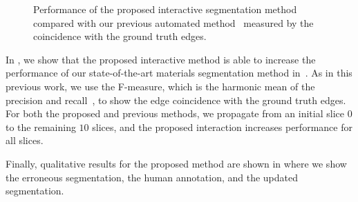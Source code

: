 \documentclass[]{spie}  %
\begin{document}
\begin{figure}[htbp]
\centering
{}

\hspace{0.1em}
\caption{Performance of the proposed interactive segmentation method
  compared with our previous automated method~\cite{waggoner:11}
  measured by the coincidence with the ground truth edges.}
\label{fig:perform}
\end{figure}

In , we show that the proposed interactive method is able
to increase the performance of our state-of-the-art materials
segmentation method in~\cite{waggoner:11}.  As in this previous work,
we use the F-measure, which is the harmonic mean of the precision and
recall~\cite{martin:01}, to show the edge coincidence with the ground
truth edges.  For both the proposed and previous methods, we propagate
from an initial slice $0$ to the remaining $10$ slices, and the
proposed interaction increases performance for all slices.

Finally, qualitative results for the proposed method are shown in
 where we show the erroneous segmentation, the human
annotation, and the updated segmentation.
\end{document}
